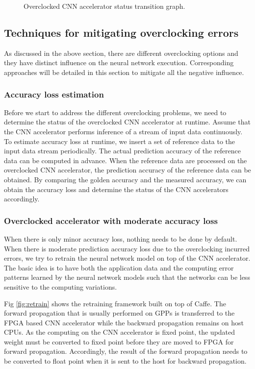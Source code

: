 \begin{figure}
    \caption{Overclocked CNN accelerator status transition graph.}
\label{fig:loss-estimation}
\vspace{-1em}
\end{figure}

\subsection{Techniques for mitigating overclocking errors}
As discussed in the above section, there are different overclocking options and 
they have distinct influence on the neural network execution. Corresponding approaches 
will be detailed in this section to mitigate all the negative influence.

\subsubsection{Accuracy loss estimation}
Before we start to address the different overclocking problems, we need to 
determine the status of the overclocked CNN accelerator at runtime. 
Assume that the CNN accelerator performs inference of a stream of input data continuously.
To estimate accuracy loss at runtime, we insert a set of reference data to the 
input data stream periodically. The actual prediction 
accuracy of the reference data can be computed in advance. When the 
reference data are processed on the overclocked CNN accelerator, the 
prediction accuracy of the reference data can be obtained. By comparing the 
golden accuracy and the measured accuracy, we can obtain the accuracy loss and 
determine the status of the CNN accelerators accordingly.

\subsubsection{Overclocked accelerator with moderate accuracy loss}
When there is only minor accuracy loss, nothing needs to be done by default.
When there is moderate prediction accuracy loss due to the overclocking incurred errors, 
we try to retrain the neural network model on top of the CNN accelerator. 
The basic idea is to have both the application data and the computing error 
patterns learned by the neural network models such that the networks 
can be less sensitive to the computing variations. 

Fig \ref{fig:retrain} shows the retraining framework built on top of Caffe.
The forward propagation that is usually performed on GPPs is transferred to 
the FPGA based CNN accelerator while the backward propagation remains on 
host CPUs. As the computing on the CNN accelerator is fixed point, the updated 
weight must be converted to fixed point before they are moved to FPGA 
for forward propagation. Accordingly, the result of the forward propagation 
needs to be converted to float point when it is sent to the host for backward 
propagation.

